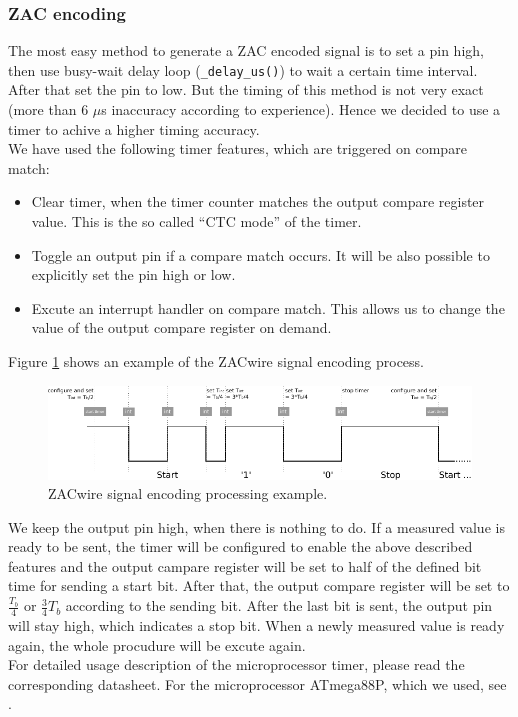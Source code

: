 \documentclass[a4paper]{scrreprt}
\begin{document}
\subsubsection{ZAC encoding}
The most easy method to generate a ZAC encoded signal is to set a pin high, then use busy-wait delay loop (\texttt{\_delay\_us()}) to wait a certain time interval. After that set the pin to low. 
But the timing of this method is not very exact (more than 6 $\mu$s inaccuracy according to experience). Hence we decided to use a timer to achive a higher timing accuracy. \\
We have used the following timer features, which are triggered on compare match: 
\begin{itemize}
  \item Clear timer, when the timer counter matches the output compare register value. This is the so called ``CTC mode'' of the timer.
  \item Toggle an output pin if a compare match occurs. It will be also possible to explicitly set the pin high or low.
  \item Excute an interrupt handler on compare match. This allows us to change the value of the output compare register on demand.
\end{itemize}
Figure \ref{fig:zac_encoding} shows an example of the ZACwire signal encoding process.\\
\begin{figure}[Hh!]
	\centering
	\includegraphics[width=\textwidth]{img/zac_encoding.pdf}
	\caption{ZACwire signal encoding processing example.}
	\label{fig:zac_encoding}
\end{figure}
We keep the output pin high, when there is nothing to do.
If a measured value is ready to be sent, the timer will be configured to enable the above described features and the output campare register will be set to half of the defined bit time for sending a start bit.
After that, the output compare register will be set to $\frac{T_{b}}{4}$ or $\frac{3}{4}T_{b}$ according to the sending bit.
After the last bit is sent, the output pin will stay high, which indicates a stop bit. 
When a newly measured value is ready again, the whole procudure will be excute again.
\\
For detailed usage description of the microprocessor timer, please read the corresponding datasheet. For the microprocessor ATmega88P, which we used, see \cite{atmega88}. 
\end{document}
